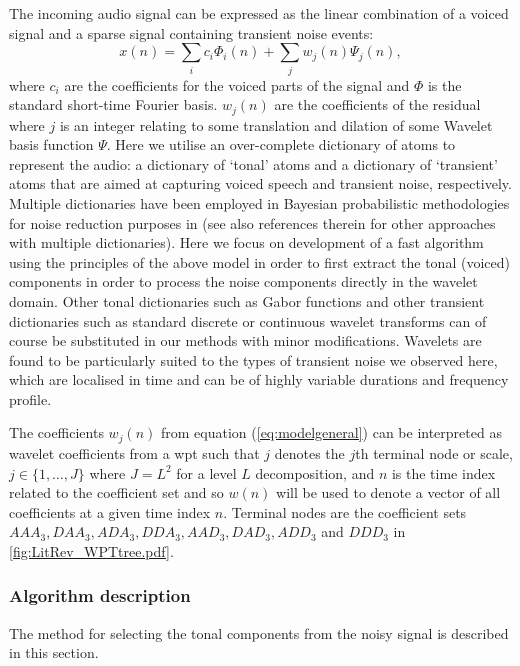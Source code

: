 The incoming audio signal can be expressed as the linear combination of a voiced signal and a sparse signal containing transient noise events:
\begin{equation}\label{eq:modelgeneral}
    x(n) = \sum_i c_i \Phi_i(n) + \sum_{j} w_{j}(n) \Psi_{j}(n),
\end{equation}
where $c_i$ are the coefficients for the voiced parts of the signal and $\Phi$ is the standard short-time Fourier basis. $w_{j}(n)$ are the coefficients of the residual where $j$ is an integer relating to some translation and dilation of some Wavelet basis function $\Psi$. Here we utilise an over-complete dictionary of atoms to represent the audio: a dictionary of `tonal' atoms and a dictionary of `transient' atoms that are aimed at capturing voiced speech and transient noise, respectively. Multiple dictionaries have been employed in Bayesian probabilistic methodologies for noise reduction purposes in \cite{Fevotte2006}\cite{Fevotte2008} (see also references therein for other approaches with multiple dictionaries). Here we focus on development of a fast algorithm using the principles of the above model in order to first extract the tonal (voiced) components in order to process the noise components directly in the wavelet domain. Other tonal dictionaries such as Gabor functions and other transient dictionaries such as standard discrete or continuous wavelet transforms can of course be substituted in our methods with minor modifications. Wavelets are found to be particularly suited to the types of transient noise we observed here, which are localised in time and can be of highly variable durations and frequency profile.

The coefficients $w_{j}(n)$ from equation (\ref{eq:modelgeneral}) can be interpreted as wavelet coefficients from a \gls{wpt} such that $j$ denotes the $j$th terminal node or scale, $j \in \{1, \ldots, J\}$ where $J = L^2$ for a level $L$ decomposition, and $n$ is the time index related to the coefficient set and so $w(n)$ will be used to denote a vector of all coefficients at a given time index $n$. Terminal nodes are the coefficient sets $AAA_3, DAA_3, ADA_3, DDA_3, AAD_3, DAD_3, ADD_3$ and $DDD_3$ in \ref{fig:LitRev_WPTtree.pdf}.

\subsubsection{Algorithm description}\label{sec:WPdetectionSep}
The method for selecting the tonal components from the noisy signal is described in this section.

